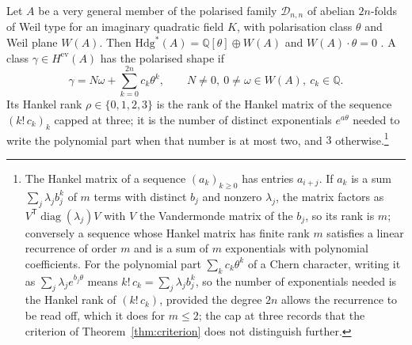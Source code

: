 \documentclass[11pt,reqno]{amsart}
\numberwithin{equation}{section}
\theoremstyle{plain}
\theoremstyle{definition}
\newcommand{\QQ}{\mathbb{Q}}
\newcommand{\Hdg}{\mathrm{Hdg}}
\newcommand{\cD}{\mathcal{D}}
\begin{document}
Let $A$ be a very general member of the polarised family $\cD_{n,n}$ of abelian $2n$-folds of Weil type for an imaginary quadratic field $K$, with polarisation class $\theta$ and Weil plane $W(A)$. Then $\Hdg^{*}(A)=\QQ[\theta]\oplus W(A)$ and $W(A)\cdot\theta=0$ \cite[Thm.~4.14]{BMB26}. A class $\gamma\in H^{\mathrm{ev}}(A)$ has the polarised shape if
\[
\gamma=N\omega+\sum_{k=0}^{2n}c_{k}\theta^{k},\qquad N\ne0,\ 0\ne\omega\in W(A),\ c_{k}\in\QQ .
\]
Its Hankel rank $\rho\in\{0,1,2,3\}$ is the rank of the Hankel matrix of the sequence $(k!\,c_{k})_{k}$ capped at three; it is the number of distinct exponentials $e^{a\theta}$ needed to write the polynomial part when that number is at most two, and $3$ otherwise.\footnote{The Hankel matrix of a sequence $(a_{k})_{k\ge0}$ has entries $a_{i+j}$. If $a_{k}$ is a sum $\sum_{j}\lambda_{j}b_{j}^{k}$ of $m$ terms with distinct $b_{j}$ and nonzero $\lambda_{j}$, the matrix factors as $V^{\mathsf{T}}\operatorname{diag}(\lambda_{j})V$ with $V$ the Vandermonde matrix of the $b_{j}$, so its rank is $m$; conversely a sequence whose Hankel matrix has finite rank $m$ satisfies a linear recurrence of order $m$ and is a sum of $m$ exponentials with polynomial coefficients. For the polynomial part $\sum_{k}c_{k}\theta^{k}$ of a Chern character, writing it as $\sum_{j}\lambda_{j}e^{b_{j}\theta}$ means $k!\,c_{k}=\sum_{j}\lambda_{j}b_{j}^{k}$, so the number of exponentials needed is the Hankel rank of $(k!\,c_{k})$, provided the degree $2n$ allows the recurrence to be read off, which it does for $m\le2$; the cap at three records that the criterion of Theorem~\ref{thm:criterion} does not distinguish further.}
\end{document}

